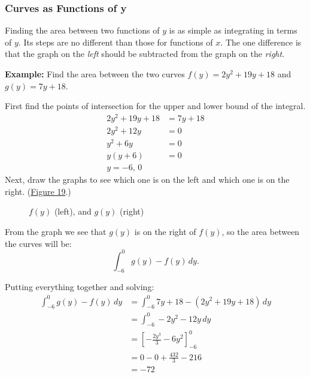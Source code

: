 \documentclass[12pt]{article}
\begin{document}
\subsubsection{Curves as Functions of y}
Finding the area between two functions of $y$ is as simple as integrating in terms of $y$. Its steps are no different than those for functions of $x$. The one difference is that the graph on the \textit{left} should be subtracted from the graph on the \textit{right}.

\noindent \textbf{Example:} Find the area between the two curves $f(y)=2y^2 + 19y + 18$ and $g(y)=7y + 18$.

\noindent First find the points of intersection for the upper and lower bound of the integral.
\begin{align*}
    2y^2 + 19y + 18 & = 7y + 18 \\
    2y^2 + 12y      & = 0       \\
    y^2 + 6y        & = 0       \\
    y(y+6)          & = 0       \\
    y = -6, \, 0
\end{align*}
Next, draw the graphs to see which one is on the left and which one is on the right. (\hyperref[fig:abcy1]{Figure 19}.)

\begin{figure}[H]
    \begin{center}
        \caption{$f(y)$ (left), and $g(y)$ (right)}
        \label{fig:abcy1}
    \end{center}
\end{figure}

From the graph we see that $g(y)$ is on the right of $f(y)$, so the area between the curves will be:
\[ \int_{-6}^0 g(y) - f(y) \, dy. \]

\noindent Putting everything together and solving:
\begin{align*}
    \int_{-6}^0 g(y) - f(y) \, dy & = \int_{-6}^0 7y + 18 - (2y^2 + 19y + 18) \, dy \\
                                  & = \int_{-6}^0 -2y^2 - 12y \, dy                 \\
                                  & = \left[ -\frac{2y^3}{3} - 6y^2 \right]_{-6}^0  \\[6pt]
                                  & = 0 - 0 + \frac{432}{3} - 216                   \\[6pt]
                                  & = -72
\end{align*}
\end{document}

